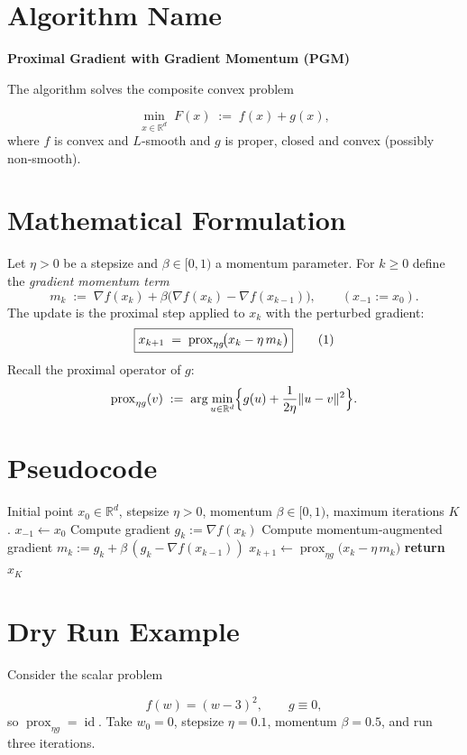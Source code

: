 \documentclass[12pt]{article}
\theoremstyle{definition}
\newcommand{\prox}{\operatorname{prox}}
\newcommand{\R}{\mathbb{R}}
\begin{document}
\section*{Algorithm Name}
\textbf{Proximal Gradient with Gradient Momentum (PGM)}  

The algorithm solves the composite convex problem  

\[
\min_{x\in\R^{d}} \; F(x)\;:=\;f(x)+g(x),
\]
where $f$ is convex and $L$‑smooth and $g$ is proper, closed and convex (possibly non‑smooth).

\section*{Mathematical Formulation}
Let $\eta>0$ be a stepsize and $\beta\in[0,1)$ a momentum parameter.  
For $k\ge 0$ define the \emph{gradient momentum term}
\[
m_{k}\;:=\;\nabla f(x_{k})+\beta\bigl(\nabla f(x_{k})-\nabla f(x_{k-1})\bigr),
\qquad (x_{-1}:=x_{0}).
\]
The update is the proximal step applied to $x_{k}$ with the perturbed gradient:
\[
\boxed{%
x_{k+1}\;=\;\prox_{\eta g}\!\bigl(x_{k}-\eta\,m_{k}\bigr)
}
\tag{1}
\]
Recall the proximal operator of $g$:
\[
\prox_{\eta g}(v)\;:=\;\arg\min_{u\in\R^{d}}\Bigl\{ g(u)+\frac{1}{2\eta}\|u-v\|^{2}\Bigr\}.
\]

\section*{Pseudocode}
\begin{algorithm}[H]
\caption{Proximal Gradient with Gradient Momentum (PGM)}\label{alg:pgm}
\begin{algorithmic}[1]
\Require Initial point $x_{0}\in\R^{d}$, stepsize $\eta>0$, momentum $\beta\in[0,1)$,
        maximum iterations $K$.
\State $x_{-1}\gets x_{0}$ 
    \State Compute gradient $g_{k}:=\nabla f(x_{k})$
    \State Compute momentum‑augmented gradient 
          $m_{k}:=g_{k}+\beta\,(g_{k}-\nabla f(x_{k-1}))$
    \State $x_{k+1}\gets \prox_{\eta g}\!\bigl(x_{k}-\eta\,m_{k}\bigr)$
\EndFor
\State \textbf{return} $x_{K}$
\end{algorithmic}
\end{algorithm}

\section*{Dry Run Example}
Consider the scalar problem  

\[
f(w)=(w-3)^{2},\qquad g\equiv0,
\]
so $\prox_{\eta g}= \operatorname{id}$.  
Take $w_{0}=0$, stepsize $\eta=0.1$, momentum $\beta=0.5$, and run three iterations.
\end{document}
